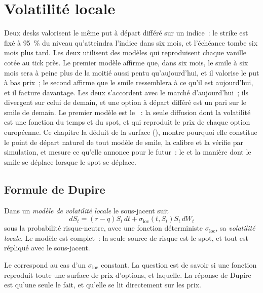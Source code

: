 \chapter{Volatilité locale}\label{ch:dv:local-volatility}

Deux desks valorisent le même put à départ différé sur un indice~: le strike est fixé à 95~\% du niveau
qu'atteindra l'indice dans six mois, et l'échéance tombe six mois plus tard.
Les deux utilisent des modèles qui reproduisent chaque vanille cotée au tick près.
Le premier modèle affirme que, dans six mois, le smile à six mois sera à peine plus de la moitié
aussi pentu qu'aujourd'hui, et il valorise le put à bas prix~;
le second affirme que le smile ressemblera à ce qu'il est aujourd'hui, et il facture davantage.
Les deux s'accordent avec le marché d'aujourd'hui~; ils divergent sur celui de demain, et une option à départ
différé est un pari sur le smile de demain. Le premier modèle est le ~:
la seule diffusion dont la volatilité est une fonction du temps et du spot, et qui reproduit le prix de chaque option européenne.
Ce chapitre la déduit de la surface (), montre pourquoi elle constitue le
point de départ naturel de tout modèle de smile, la calibre et la vérifie par simulation, et
mesure ce qu'elle annonce pour le futur~: le  et la manière dont le smile se
déplace lorsque le spot se déplace.

\section{Formule de Dupire}

\begin{definition}\label{def:dv:local-volatility:model}
Dans un \emph{modèle de volatilité locale} le sous-jacent suit
\[
dS_t=(r-q)S_t\,dt+\sigma_{\mathrm{loc}}(t,S_t)S_t\,dW_t
\]
sous la probabilité risque-neutre, avec une fonction déterministe $\sigma_{\mathrm{loc}}$, sa
\emph{volatilité locale}. Le modèle est complet~: la seule source de
risque est le spot, et tout  est répliqué avec le sous-jacent.
\end{definition}

Le  correspond au cas d'un $\sigma_{\mathrm{loc}}$ constant. La question est
de savoir si une fonction reproduit toute une surface de prix d'options, et laquelle. La réponse de Dupire
est qu'une seule le fait, et qu'elle se lit directement sur les prix.


